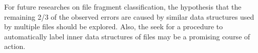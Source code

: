  For future researches on file fragment classification, the hypothesis that the remaining 2/3 of the observed errors are caused by similar data structures used by multiple files should be explored. Also,  the seek for a procedure to automatically label inner data structures of files may be a promising course of action. 

















    
